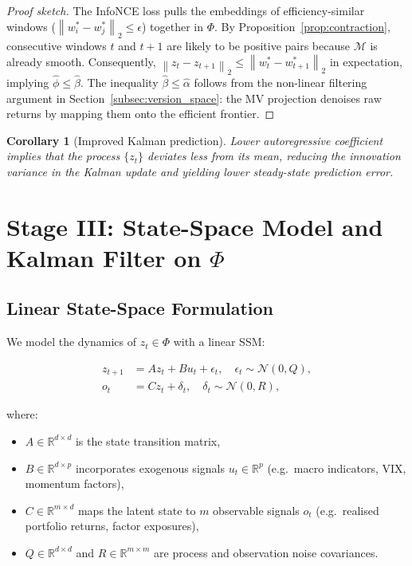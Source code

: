 \documentclass[12pt, a4paper]{report}
\theoremstyle{plain}
\newtheorem{corollary}[theorem]{Corollary}
\theoremstyle{definition}
\newcommand{\R}{\mathbb{R}}
\newcommand{\calM}{\mathcal{M}}
\newcommand{\norm}[1]{\left\|#1\right\|}
\begin{document}
\begin{proof}[Proof sketch]
The InfoNCE loss pulls the embeddings of efficiency-similar windows
($\norm{w_i^* - w_j^*}_2 \le \epsilon$) together in $\Phi$.  By
Proposition~\ref{prop:contraction}, consecutive windows $t$ and $t{+}1$ are
likely to be positive pairs because $\calM$ is already smooth.  Consequently,
$\norm{z_t - z_{t+1}}_2 \le \norm{w_t^* - w_{t+1}^*}_2$ in expectation,
implying $\hat{\phi} \le \hat{\beta}$.  The inequality $\hat{\beta} \le \hat{\alpha}$
follows from the non-linear filtering argument in
Section~\ref{subsec:version_space}: the MV projection denoises raw returns by
mapping them onto the efficient frontier.
\end{proof}

\begin{corollary}[Improved Kalman prediction]
Lower autoregressive coefficient implies that the process $\{z_t\}$ deviates
less from its mean, reducing the innovation variance in the Kalman update and
yielding lower steady-state prediction error.
\end{corollary}

\section{Stage III: State-Space Model and Kalman Filter on \texorpdfstring{$\Phi$}{Phi}}
\label{sec:kalman}

\subsection{Linear State-Space Formulation}
\label{subsec:ssm}

We model the dynamics of $z_t \in \Phi$ with a linear SSM:

\begin{align}
  z_{t+1} &= A z_t + B u_t + \epsilon_t,
  \quad \epsilon_t \sim \mathcal{N}(0, Q),
  \label{eq:state_eq}\\
  o_t &= C z_t + \delta_t,
  \quad \delta_t \sim \mathcal{N}(0, R),
  \label{eq:obs_eq}
\end{align}

where:
\begin{itemize}
  \item $A \in \R^{d \times d}$ is the state transition matrix,
  \item $B \in \R^{d \times p}$ incorporates exogenous signals $u_t \in \R^p$
        (e.g.\ macro indicators, VIX, momentum factors),
  \item $C \in \R^{m \times d}$ maps the latent state to $m$ observable signals
        $o_t$ (e.g.\ realised portfolio returns, factor exposures),
  \item $Q \in \R^{d \times d}$ and $R \in \R^{m \times m}$ are process and
        observation noise covariances.
\end{itemize}
\end{document}
